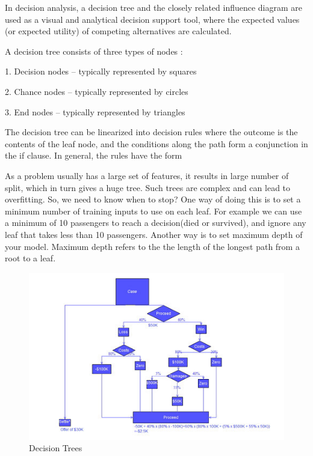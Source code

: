 \documentclass[12pt]{article}
\begin{document}
In decision analysis, a decision tree and the closely related influence diagram are used as a visual and analytical decision support tool, where the expected values (or expected utility) of competing alternatives are calculated.

A decision tree consists of three types of nodes : 

1. Decision nodes – typically represented by squares

2. Chance nodes – typically represented by circles

3. End nodes – typically represented by triangles

The decision tree can be linearized into decision rules where the outcome is the contents of the leaf node, and the conditions along the path form a conjunction in the if clause. In general, the rules have the form

As a problem usually has a large set of features, it results in large number of split, which in turn gives a huge tree. Such trees are complex and can lead to overfitting. So, we need to know when to stop? One way of doing this is to set a minimum number of training inputs to use on each leaf. For example we can use a minimum of 10 passengers to reach a decision(died or survived), and ignore any leaf that takes less than 10 passengers. Another way is to set maximum depth of your model. Maximum depth refers to the the length of the longest path from a root to a leaf.

\begin{center}
\begin{figure}[h]
\centerline{\includegraphics[scale=.7]{IMG_8205.jpg}}
\caption{Decision Trees}
\end{figure}
\end{center}
\end{document}
